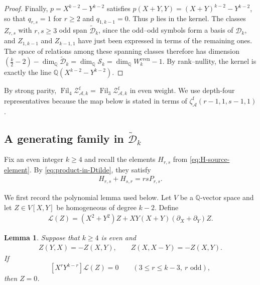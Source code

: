 \documentclass[12pt]{amsart}
\numberwithin{equation}{section}
\theoremstyle{plain}
\newtheorem{lem}[lem]{Lemma}
\newcommand{\even}{\mathrm{even}}
\newcommand{\QQ}{\mathbb{Q}}
\DeclareMathOperator{\Fil}{Fil}
\newcommand{\ZAfw}[1]{{\mathcal Z_{\mathcal A,#1}^{\mathrm f}}}
\newcommand{\zaf}[1]{\zeta_{\mathcal A}^{\mathrm f}(#1)}
\newcommand{\Dk}{\mathcal D_k}
\newcommand{\Dtk}{\widetilde{\mathcal D}_k}
\begin{document}
\begin{proof}
Finally, $p=X^{k-2}-Y^{k-2}$ satisfies
$p(X+Y,Y)=(X+Y)^{k-2}-Y^{k-2}$, so that $q_{r,s}=1$ for $r\geq2$ and
$q_{1,k-1}=0$. Thus $p$ lies in the kernel. The classes $Z_{r,s}$ with
$r,s\geq3$ odd span $\Dtk$, since the odd--odd symbols form a basis of
$\Dk$, and $Z_{1,k-1}$ and $Z_{k-1,1}$ have just been expressed in terms
of the remaining ones. The space of relations among these spanning
classes therefore has dimension
$(\frac k2-2)-\dim_{\QQ}\Dtk=\dim_{\QQ}\mathcal S_k
=\dim_{\QQ}W_k^{\even}-1$. By rank--nullity, the kernel is exactly the
line $\QQ(X^{k-2}-Y^{k-2})$.
\end{proof}

By strong parity, $\Fil_4\ZAfw{k}=\Fil_3\ZAfw{k}$ in even weight. We use
depth-four representatives because the map below is stated in terms of
$\zaf{r-1,1,s-1,1}$.

\subsection{A generating family in \texorpdfstring{$\Dtk$}{D-tilde}}

Fix an even integer $k\geq4$ and recall the elements $H_{r,s}$ from
\eqref{eq:H-source-element}. By \eqref{eq:product-in-Dtilde}, they satisfy
\begin{align}\label{eq:H-source-symmetry}
 H_{r,s}+H_{s,r}=rsP_{r,s}.
\end{align}

We first record the polynomial lemma used below. Let $V$ be a
$\QQ$-vector space and let $Z\in V[X,Y]$ be homogeneous of degree
$k-2$. Define
\begin{align}\label{eq:H-source-operator}
 \mathcal L(Z)=(X^2+Y^2)Z+XY(X+Y)(\partial_X+\partial_Y)Z.
\end{align}

\begin{lem}\label{lem:dihedral-odd-coefficients}
Suppose that $k\geq4$ is even and
\begin{align}\label{eq:dihedral-anti-invariance}
 Z(Y,X)=-Z(X,Y),\qquad Z(X,X-Y)=-Z(X,Y).
\end{align}
If
\[
 [X^rY^{k-r}]\mathcal L(Z)=0
 \qquad(3\leq r\leq k-3,\ r\text{ odd}),
\]
then $Z=0$.
\end{lem}
\end{document}
